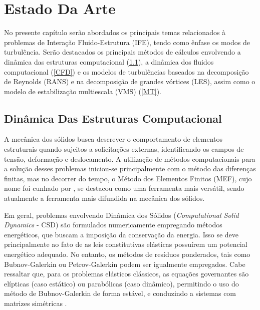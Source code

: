 \chapter{Estado Da Arte}

No presente capítulo serão abordados os principais temas relacionados à problemas de Interação Fluido-Estrutura (IFE), tendo como ênfase os modos de turbulência. Serão destacados os principais métodos de cálculos envolvendo a dinâmica das estruturas computacional (\ref{CSD}), a dinâmica dos fluidos computacional (\ref{CFD}) e os modelos de turbulências baseados na decomposição de Reynolds (RANS) e na decomposição de grandes vórtices (LES), assim como o modelo de estabilização multiescala (VMS) (\ref{MT}).

\section{Dinâmica Das Estruturas Computacional} \label{CSD}

A mecânica dos sólidos busca descrever o comportamento de elementos estruturais quando sujeitos a solicitações externas, identificando os campos de tensão, deformação e deslocamento. A utilização de métodos computacionais para a solução desses problemas iniciou-se principalmente com o método das diferenças finitas, mas no decorrer do tempo, o Método dos Elementos Finitos (MEF), cujo nome foi cunhado por , se destacou como uma ferramenta mais versátil, sendo atualmente a ferramenta mais difundida na mecânica dos sólidos.

Em geral, problemas envolvendo Dinâmica dos Sólidos (\textit{Computational Solid Dynamics} - CSD) são formulados numericamente empregando métodos energéticos, que buscam a imposição da conservação da energia. Isso se deve principalmente ao fato de as leis constitutivas elásticas possuírem um potencial energético adequado. No entanto, os métodos de resíduos ponderados, tais como Bubnov-Galerkin ou Petrov-Galerkin podem ser igualmente empregados. Cabe ressaltar que, para os problemas elásticos clássicos, as equações governantes são elípticas (caso estático) ou parabólicas (caso dinâmico), permitindo o uso do método de Bubnov-Galerkin de forma estável, e conduzindo a sistemas com matrizes simétricas \cite{de2012nonlinear}.

